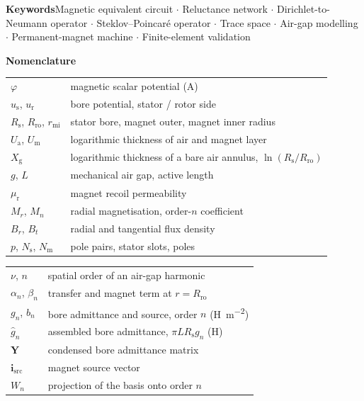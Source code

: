 \documentclass[10pt,a4paper,twocolumn]{article}
\newcommand{\Rs}{R_{\mathrm{s}}}
\newcommand{\Rro}{R_{\mathrm{ro}}}
\newcommand{\rmi}{r_{\mathrm{mi}}}
\newcommand{\murec}{\mu_{\mathrm{r}}}
\newcommand{\Ua}{U_{\mathrm{a}}}
\newcommand{\Um}{U_{\mathrm{m}}}
\newcommand{\Xg}{X_{\mathrm{g}}}
\theoremstyle{plain}
\theoremstyle{remark}
\begin{document}
{\rmfamily\bfseries Keywords}\quad Magnetic equivalent circuit $\cdot$ Reluctance network
$\cdot$ Dirichlet-to-Neumann operator $\cdot$ Steklov--Poincar\'e operator $\cdot$ Trace space $\cdot$ Air-gap modelling $\cdot$
Permanent-magnet machine $\cdot$ Finite-element validation
\vspace{4mm}
\vspace{5mm}

\begin{center}{\rmfamily\bfseries Nomenclature}\end{center}
\vspace{-1mm}
{\footnotesize
\parbox[t]{0.485\textwidth}{\begin{tabular}{@{}p{16mm}p{56mm}@{}}
$\varphi$ & magnetic scalar potential (A)\\
$u_{\mathrm{s}}$, $u_{\mathrm{r}}$ & bore potential, stator / rotor side\\
$\Rs$, $\Rro$, $\rmi$ & stator bore, magnet outer, magnet inner radius\\
$\Ua$, $\Um$ & logarithmic thickness of air and magnet layer\\
$\Xg$ & logarithmic thickness of a bare air annulus, $\ln(\Rs/\Rro)$\\
$g$, $L$ & mechanical air gap, active length\\
$\murec$ & magnet recoil permeability\\
$M_r$, $M_n$ & radial magnetisation, order-$n$ coefficient\\
$B_r$, $B_t$ & radial and tangential flux density\\
$p$, $N_{\mathrm{s}}$, $N_{\mathrm{m}}$ & pole pairs, stator slots, poles\\
\end{tabular}}\hfill
\parbox[t]{0.485\textwidth}{\begin{tabular}{@{}p{16mm}p{56mm}@{}}
$\nu$, $n$ & spatial order of an air-gap harmonic\\
$\alpha_n$, $\beta_n$ & transfer and magnet term at $r=\Rro$\\
$g_n$, $b_n$ & bore admittance and source, order $n$ (\si{\henry\per\metre\squared})\\
$\hat{g}_n$ & assembled bore admittance, $\pi L\Rs g_n$ (\si{\henry})\\
$\bm{Y}$ & condensed bore admittance matrix\\
$\bm{i}_{\mathrm{src}}$ & magnet source vector\\
$W_n$ & projection of the basis onto order $n$\\

\end{tabular}}}
\end{document}
